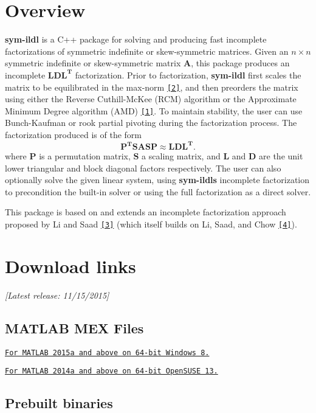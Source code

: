 \hypertarget{index_intro_sec}{}\section{Overview}\label{index_intro_sec}
{\bfseries sym-\/ildl} is a C++ package for solving and producing fast incomplete factorizations of symmetric indefinite or skew-\/symmetric matrices. Given an $n\times n$ symmetric indefinite or skew-\/symmetric matrix $\mathbf{A}$, this package produces an incomplete $\mathbf{LDL^{T}}$ factorization. Prior to factorization, {\bfseries sym-\/ildl} first scales the matrix to be equilibrated in the max-\/norm \href{#refs}{\tt \mbox{[}2\mbox{]}}, and then preorders the matrix using either the Reverse Cuthill-\/\+Mc\+Kee (R\+CM) algorithm or the Approximate Minimum Degree algorithm (A\+MD) \href{#refs}{\tt \mbox{[}1\mbox{]}}. To maintain stability, the user can use Bunch-\/\+Kaufman or rook partial pivoting during the factorization process. The factorization produced is of the form \[ \mathbf{P^{T}SASP \approx LDL^{T}}. \] where $\mathbf{P}$ is a permutation matrix, $\mathbf{S}$ a scaling matrix, and $\mathbf{L}$ and $\mathbf{D}$ are the unit lower triangular and block diagonal factors respectively. The user can also optionally solve the given linear system, using {\bfseries sym-\/ildl\textquotesingle{}s} incomplete factorization to precondition the built-\/in solver or using the full factorization as a direct solver.

This package is based on and extends an incomplete factorization approach proposed by Li and Saad \href{#refs}{\tt \mbox{[}3\mbox{]}} (which itself builds on Li, Saad, and Chow \href{#refs}{\tt \mbox{[}4\mbox{]}}).\hypertarget{index_dlinks}{}\section{Download links}\label{index_dlinks}
{\itshape \mbox{[}Latest release\+: 11/15/2015\mbox{]}} \hypertarget{index_matlab_dlinks}{}\subsection{M\+A\+T\+L\+A\+B M\+E\+X Files}\label{index_matlab_dlinks}

\begin{DoxyItemize}
\item \href{https://github.com/inutard/matrix-factor/raw/master/release/win64/ildl-2015a.zip}{\tt For M\+A\+T\+L\+AB 2015a and above on 64-\/bit Windows 8.}
\item \href{https://github.com/inutard/matrix-factor/raw/master/release/linux/ildl-2014a.zip}{\tt For M\+A\+T\+L\+AB 2014a and above on 64-\/bit Open\+S\+U\+SE 13.} 
\end{DoxyItemize}\hypertarget{index_binary_dlinks}{}\subsection{Prebuilt binaries}\label{index_binary_dlinks}


